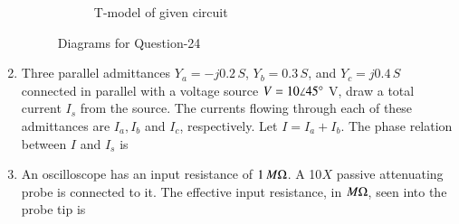 \documentclass[journal,12pt,onecolumn]{IEEEtran}
\theoremstyle{remark}
\begin{document}
\begin{enumerate}
\begin{figure}[H]
\begin{subfigure}{.5\columnwidth}
  \caption{T-model of given circuit}
  \label{24(b)}
\end{subfigure}
\caption{Diagrams for Question-24}
\label{24}
\end{figure}
\begin{enumerate}
\end{enumerate}

\item Three parallel admittances $Y_a=-j0.2\,S$, $Y_b=0.3\,S$, and $Y_c=j0.4\,S$ connected in parallel with a voltage source $V=10\angle 45\degree$ V, draw a total current $I_s$ from the source. The currents flowing through each of these admittances are $I_a, I_b$ and $I_c$, respectively. Let $I=I_a+I_b$. The phase relation between $I$ and $I_s$ is
\par\hfill{}
\begin{enumerate}
\end{enumerate}


\item An oscilloscope has an input resistance of $1\,M\ohm$. A 10$X$ passive attenuating probe is connected to it. The effective input resistance, in $M\ohm$, seen into the probe tip is \par\hfill{}
\begin{enumerate}
\end{enumerate}


\end{enumerate}
\end{document}

